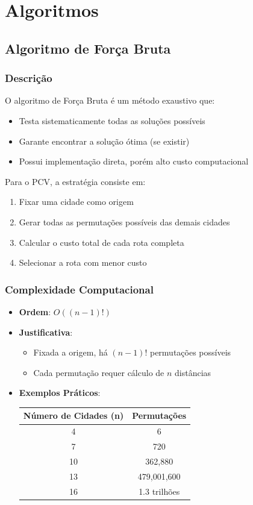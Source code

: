 \section{Algoritmos}

\subsection{Algoritmo de Força Bruta}

\subsubsection{Descrição}
O algoritmo de Força Bruta é um método exaustivo que:

\begin{itemize}
\item Testa sistematicamente todas as soluções possíveis
\item Garante encontrar a solução ótima (se existir)
\item Possui implementação direta, porém alto custo computacional
\end{itemize}

Para o PCV, a estratégia consiste em:

\begin{enumerate}
\item Fixar uma cidade como origem
\item Gerar todas as permutações possíveis das demais cidades
\item Calcular o custo total de cada rota completa
\item Selecionar a rota com menor custo
\end{enumerate}

\subsubsection{Complexidade Computacional}
\begin{itemize}
\item \textbf{Ordem}: $O((n-1)!)$
\item \textbf{Justificativa}:
  \begin{itemize}
  \item Fixada a origem, há $(n-1)!$ permutações possíveis
  \item Cada permutação requer cálculo de $n$ distâncias
  \end{itemize}
  
\item \textbf{Exemplos Práticos}:
  \begin{table}[h]
  \centering
  \begin{tabular}{|c|c|}
  \hline
  \textbf{Número de Cidades (n)} & \textbf{Permutações} \\
  \hline
  4 & 6 \\
  7 & 720 \\
  10 & 362,880 \\
  13 & 479,001,600 \\
  16 & 1.3 trilhões \\
  \hline
  \end{tabular}
  \end{table}
\end{itemize}

